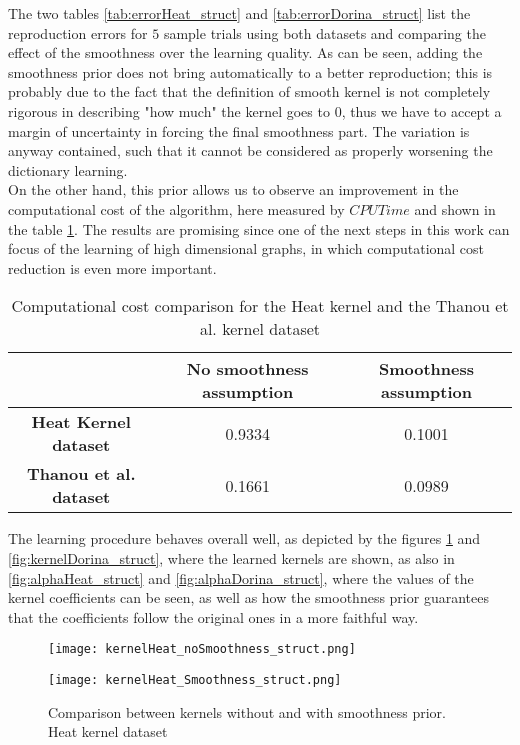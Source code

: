 The two tables \ref{tab:errorHeat_struct} and \ref{tab:errorDorina_struct} list the reproduction errors for $5$ sample trials using both datasets and comparing the effect of the smoothness over the learning quality. As can be seen, adding the smoothness prior does not bring automatically to a better reproduction; this is probably due to the fact that the definition of smooth kernel is not completely rigorous in describing "how much" the kernel goes to $0$, thus we have to accept a margin of uncertainty in forcing the final smoothness part. The variation is anyway contained, such that it cannot be considered as properly worsening the dictionary learning.\\

On the other hand, this prior allows us to observe an improvement in the computational cost of the algorithm, here measured by $CPUTime$ and shown in the table \ref{tab:CPUTime_struct}. The results are promising since one of the next steps in this work can focus of the learning of high dimensional graphs, in which computational cost reduction is even more important.

\begin{table}[htbp]
  \centering
  \begin{tabular}{c|c|c}
    &
    \multicolumn{1}{c}{\textbf{No smoothness assumption}} &
    \multicolumn{1}{|c}{\textbf{Smoothness assumption}}\\
    \hline
    \textbf{Heat Kernel dataset} & 0.9334 & 0.1001\\
    \textbf{Thanou et al. dataset} & 0.1661 & 0.0989 \\
  \end{tabular}
  \caption{Computational cost comparison for the Heat kernel and the Thanou et al. kernel dataset}
  \label{tab:CPUTime_struct}
\end{table}

The learning procedure behaves overall well, as depicted by the figures \ref{fig:kernelHeat_struct} and \ref{fig:kernelDorina_struct}, where the learned kernels are shown, as also in \autoref{fig:alphaHeat_struct} and \autoref{fig:alphaDorina_struct}, where the values of the kernel coefficients can be seen, as well as how the smoothness prior guarantees that the coefficients follow the original ones in a more faithful way.

\begin{figure}
  \begin{minipage}[c]{.5\textwidth}
    \centering
    \texttt{[image: kernelHeat\_noSmoothness\_struct.png]}
  \end{minipage}
  \begin{minipage}[c]{.5\textwidth}
    \centering
    \texttt{[image: kernelHeat\_Smoothness\_struct.png]}
  \end{minipage}
  \caption{Comparison between kernels without and with smoothness prior. Heat kernel dataset}
  \label{fig:kernelHeat_struct}
\end{figure}

